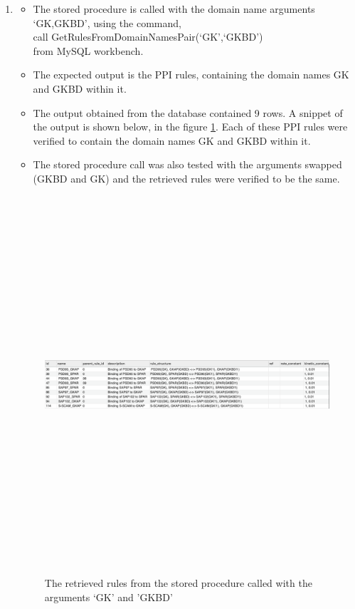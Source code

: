 \documentclass[msc,deptreport,ai]{infthesis}      %
\begin{document}
\begin{enumerate}
	\item 
\begin{itemize}
	\item 	The stored procedure is called with the domain name arguments `GK,GKBD', using the command, \\
	call GetRulesFromDomainNamesPair(`GK',`GKBD')\\
	from MySQL workbench. 
	\item The expected output is the PPI rules, containing the domain names GK and GKBD within it.
	\item The output obtained from the database contained 9 rows. A snippet of the output is shown below, in the figure \ref{fig:DomainNameOutput2}. Each of these PPI rules were verified to contain the domain names GK and GKBD within it.
	\item The stored procedure call was also tested with the arguments swapped (GKBD and GK) and the retrieved rules were verified to be the same.		
\end{itemize}
\begin{figure}[H]
	\centering
	\captionsetup{justification=centering}
	\includegraphics[width=\linewidth,height=14cm,keepaspectratio]{DomainNameOutput2.png}	
	\caption{The retrieved rules from the stored procedure called with the arguments `GK' and 'GKBD'}
	\label{fig:DomainNameOutput2}		
\end{figure}
\end{enumerate}
\end{document}
